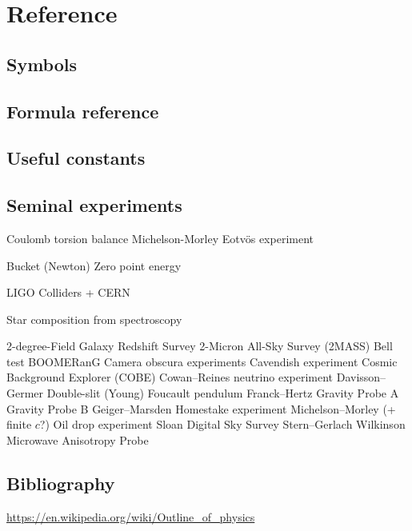 \documentclass{report}
\begin{document}
\part{Reference}
\appendix

\chapter{Symbols}

\chapter{Formula reference}

\chapter{Useful constants}


\chapter{Seminal experiments}
Coulomb torsion balance
Michelson-Morley
Eotvös experiment

Bucket (Newton)
Zero point energy

LIGO
Colliders + CERN

Star composition from spectroscopy

2-degree-Field Galaxy Redshift Survey
2-Micron All-Sky Survey (2MASS)
Bell test
BOOMERanG
Camera obscura experiments
Cavendish experiment
Cosmic Background Explorer (COBE)
Cowan–Reines neutrino experiment
Davisson–Germer
Double-slit (Young)
Foucault pendulum
Franck–Hertz
Gravity Probe A
Gravity Probe B
Geiger–Marsden
Homestake experiment
Michelson–Morley (+ finite $c$?)
Oil drop experiment
Sloan Digital Sky Survey
Stern–Gerlach
Wilkinson Microwave Anisotropy Probe

\chapter{Bibliography}

\url{https://en.wikipedia.org/wiki/Outline_of_physics}
\end{document}
